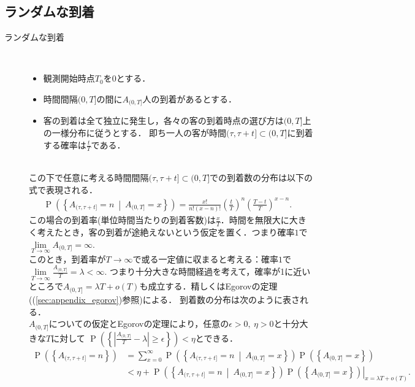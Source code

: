 \documentclass[a4j,papersize,disablejfam,slide,14pt]{jsarticle}
\def\prob#1{\operatorname{P} \left(\left\{ #1 \right\}\right)} %
\def\cprob#1#2{\operatorname{P} \left(\left\{ #1 \ \middle|\ #2 \right\}\right)} %
\begin{document}
\subsection{ランダムな到着}
    \begin{description}
    	\item[ランダムな到着]\mbox{}\\
        	\begin{itemize}
    			\item 観測開始時点$T_0$を$0$とする．
        		\item 時間間隔$(0, T]$の間に$A_{(0, T]}$人の到着があるとする．
        		\item 客の到着は全て独立に発生し，各々の客の到着時点の選び方は$(0, T]$上の一様分布に従うとする．
                即ち一人の客が時間$(\tau, \tau + t] \subset (0, T]$に到着する確率は$\frac{t}{T}$である．
            \end{itemize}
            \mbox{}\\
        	この下で任意に考える時間間隔$(\tau, \tau + t] \subset (0, T]$での到着数の分布は以下の式で表現される．
        	\begin{align}
        		\cprob{A_{(\tau, \tau + t]} = n}{A_{(0, T]}=x} = \frac{x!}{n!(x-n)!} \left( \frac{t}{T} \right)^n \left( \frac{T-t}{T} \right)^{x-n}. & \label{eq:random_arrival}
        	\end{align}
        	この場合の到着率(単位時間当たりの到着客数)は$\frac{x}{T}$．時間を無限大に大きく考えたとき，客の到着が途絶えないという仮定を置く．つまり確率$1$で
            $\lim\limits_{T \to \infty} A_{(0, T]}=\infty.$ \\
        	このとき，到着率が$T \to \infty$で或る一定値に収まると考える：確率$1$で$\lim\limits_{T \to \infty} \frac{A_{(0, T]}}{T} = \lambda < \infty.$
        	つまり十分大きな時間経過を考えて，確率が1に近いところで$A_{(0, T]} = \lambda T + o(T)$も成立する．精しくは{\rm Egorov}の定理((\ref{sec:appendix_egorov})参照)による．
            到着数の分布は次のように表される．\\
            $A_{(0, T]}$についての仮定と{\rm Egorov}の定理により，任意の$\epsilon > 0,\ \eta > 0$と十分大きな$T$に対して
            $\prob{ \left|\frac{A_{(0, T]}}{T} - \lambda \right| \geq \epsilon} < \eta$とできる．
        	\begin{align}
        		\prob{A_{(\tau, \tau + t]} = n} &= \sum_{x=0}^{\infty} \cprob{A_{(\tau, \tau + t]} = n}{A_{(0, T]}=x} \prob{A_{(0, T]}=x} \\
                &< \eta + \left. \cprob{A_{(\tau, \tau + t]} = n}{A_{(0, T]}=x} \prob{A_{(0, T]}=x} \right|_{x=\lambda T + o(T)}.

\end{align}
\end{description}
\end{document}
